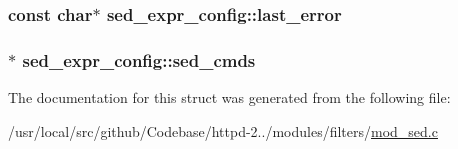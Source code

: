 \subsubsection[{\texorpdfstring{last\+\_\+error}{last_error}}]{\setlength{\rightskip}{0pt plus 5cm}const char$\ast$ sed\+\_\+expr\+\_\+config\+::last\+\_\+error}\hypertarget{structsed__expr__config_af04f1a3c8174221aec8e9a026bd3b5e6}{}\label{structsed__expr__config_af04f1a3c8174221aec8e9a026bd3b5e6}
\subsubsection[{\texorpdfstring{sed\+\_\+cmds}{sed_cmds}}]{$\ast$ sed\+\_\+expr\+\_\+config\+::sed\+\_\+cmds}\hypertarget{structsed__expr__config_ab5253a4b22d52752fc5fdefd1a3a5230}{}\label{structsed__expr__config_ab5253a4b22d52752fc5fdefd1a3a5230}


The documentation for this struct was generated from the following file\+:\begin{DoxyCompactItemize}
\item 
/usr/local/src/github/\+Codebase/httpd-\/2../modules/filters/\hyperlink{mod__sed_8c}{mod\+\_\+sed.\+c}\end{DoxyCompactItemize}
